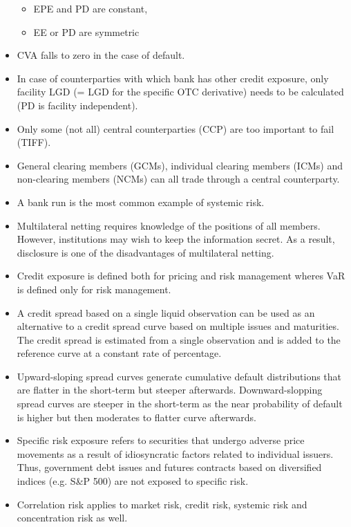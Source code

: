 \begin{itemize}
	\begin{itemize}
		\item EPE and PD are constant,
		\item EE or PD are symmetric
	\end{itemize}
	\item CVA falls to zero in the case of default.
	\item In case of counterparties with which bank has other credit exposure, only facility LGD (= LGD for the specific OTC derivative) needs to be calculated (PD is facility independent).
	\item Only some (not all) central counterparties (CCP) are too important to fail (TIFF).
	\item General clearing members (GCMs), individual clearing members (ICMs) and non-clearing members (NCMs) can all trade through a central counterparty.
	\item A bank run is the most common example of systemic risk.
	\item Multilateral netting requires knowledge of the positions of all members. However, institutions may wish to keep the information secret. As a result, disclosure is one of the disadvantages of multilateral netting.
	\item Credit exposure is defined both for pricing and risk management wheres VaR is defined only for risk management.
	\item A credit spread based on a single liquid observation can be used as an alternative to a credit spread curve based on multiple issues and maturities. The credit spread is estimated from a single observation and is added to the reference curve at a constant rate of percentage.
	\item Upward-sloping spread curves generate cumulative default 
	distributions that are flatter in the short-term but steeper afterwards. Downward-slopping spread curves are steeper in the short-term as the near probability of default is higher but then moderates to flatter curve afterwards.
	\item Specific risk exposure refers to securities that undergo adverse price movements as a result of idiosyncratic factors related to individual issuers. Thus, government debt issues and futures contracts based on diversified indices (e.g. S\&P 500) are not exposed to specific risk.
	\item Correlation risk applies to market risk, credit risk, systemic risk and concentration risk as well.
\end{itemize}

